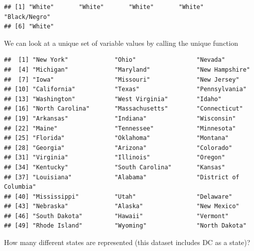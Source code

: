 \documentclass[
]{book}
\newenvironment{Shaded}{\begin{snugshade}}{\end{snugshade}}
\newcommand{\KeywordTok}[1]{\textcolor[rgb]{0.13,0.29,0.53}{\textbf{#1}}}
\newcommand{\NormalTok}[1]{#1}
\newcommand{\OperatorTok}[1]{\textcolor[rgb]{0.81,0.36,0.00}{\textbf{#1}}}
\theoremstyle{definition}
\theoremstyle{definition}
\theoremstyle{definition}
\theoremstyle{definition}
\theoremstyle{remark}
\begin{document}
\begin{Shaded}
\end{Shaded}

\begin{verbatim}
## [1] "White"       "White"       "White"       "White"       "Black/Negro"
## [6] "White"
\end{verbatim}

We can look at a unique set of variable values by calling the unique function

\begin{Shaded}
\end{Shaded}

\begin{verbatim}
##  [1] "New York"             "Ohio"                 "Nevada"              
##  [4] "Michigan"             "Maryland"             "New Hampshire"       
##  [7] "Iowa"                 "Missouri"             "New Jersey"          
## [10] "California"           "Texas"                "Pennsylvania"        
## [13] "Washington"           "West Virginia"        "Idaho"               
## [16] "North Carolina"       "Massachusetts"        "Connecticut"         
## [19] "Arkansas"             "Indiana"              "Wisconsin"           
## [22] "Maine"                "Tennessee"            "Minnesota"           
## [25] "Florida"              "Oklahoma"             "Montana"             
## [28] "Georgia"              "Arizona"              "Colorado"            
## [31] "Virginia"             "Illinois"             "Oregon"              
## [34] "Kentucky"             "South Carolina"       "Kansas"              
## [37] "Louisiana"            "Alabama"              "District of Columbia"
## [40] "Mississippi"          "Utah"                 "Delaware"            
## [43] "Nebraska"             "Alaska"               "New Mexico"          
## [46] "South Dakota"         "Hawaii"               "Vermont"             
## [49] "Rhode Island"         "Wyoming"              "North Dakota"
\end{verbatim}

How many different states are represented (this dataset includes DC as a state)?
\end{document}
